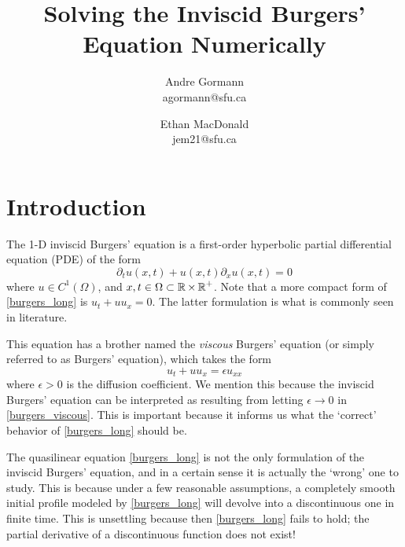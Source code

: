 \documentclass{myproject}
\title{\vspace*{-1cm}Solving the Inviscid Burgers' Equation Numerically}
\date{}
\author{
    Andre Gormann\\
    agormann@sfu.ca
    \and
    Ethan MacDonald\\
    jem21@sfu.ca
}
\begin{document}
\maketitle
\vspace*{-1cm}
\tableofcontents

\section{Introduction}

The 1-D inviscid Burgers' equation is a first-order hyperbolic partial differential equation (PDE) of the form
\begin{equation}\label{burgers_long}
    \partial_t u(x,t) + u(x,t)\partial_xu(x,t) = 0
\end{equation}
where $u \in C^1(\Omega)$, and $x,t \in \Omega \subset \operatorname{\mathbb{R}}\times\operatorname{\mathbb{R}}^+$. Note that a more compact form of \eqref{burgers_long} is $u_t + uu_x = 0$. The latter formulation is what is commonly seen in literature. 

This equation has a brother named the \emph{viscous} Burgers' equation (or simply referred to as Burgers' equation), which takes the form
\begin{equation}\label{burgers_viscous}
    u_t + uu_x = \epsilon u_{xx}
\end{equation}
where $\epsilon > 0$ is the diffusion coefficient. We mention this because the inviscid Burgers' equation can be interpreted as resulting from letting $\epsilon \to 0$ in \eqref{burgers_viscous}. This is important because it informs us what the `correct' behavior of \eqref{burgers_long} should be.

The quasilinear equation \eqref{burgers_long} is not the only formulation of the inviscid Burgers' equation, and in a certain sense it is actually the `wrong' one to study. This is because under a few reasonable assumptions, a completely smooth initial profile modeled by \eqref{burgers_long} will devolve into a discontinuous one in finite time. This is unsettling because then \eqref{burgers_long} fails to hold; the partial derivative of a discontinuous function does not exist!
\end{document}
